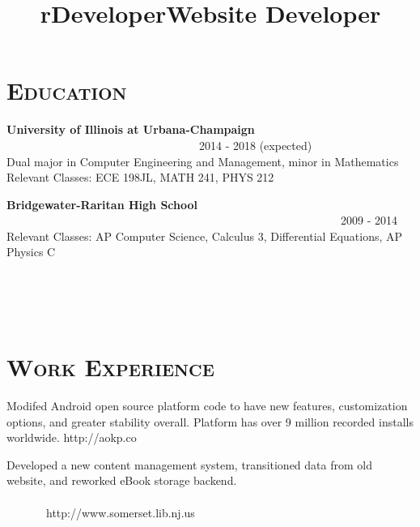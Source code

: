\begin{resume}
\section{\textsc{Education}}
\textbf{University of Illinois at Urbana-Champaign} \ \ \ \ \ \ \ \ \ \ \ \ \ \ \ \ \ \ \ \ \ \ \ \ \ \ \ \ \ \ \ \ \ \ 2014 - 2018 (expected) \\
Dual major in Computer Engineering and Management, minor in Mathematics \\
Relevant Classes: ECE 198JL, MATH 241, PHYS 212

\textbf{Bridgewater-Raritan High School} \ \ \ \ \ \ \ \ \ \ \ \ \ \ \ \ \ \ \ \ \ \ \ \ \ \ \ \ \ \ \ \ \ \ \ \ \ \ \ \ \ \ \ \ \ \ \ \ \ \ \ \ \ \ \ \ \ \ \ 2009 - 2014 \\
Relevant Classes: AP Computer Science, Calculus 3, Differential Equations, AP Physics C

\begin{formatb}
  \title{r}\\
  \\
  \body\\
\end{formatb}

\section{\textsc{Work Experience}}

\title{Developer}
\begin{position}
Modifed Android open source platform code to have new features, customization options, and greater stability overall. Platform has over 9 million recorded installs worldwide. http://aokp.co
\end{position}

\title{Website Developer}
\begin{position}
Developed a new content management system, transitioned data from old website, and reworked eBook storage backend. \ \ \ \ \ \ \ \ \ \ \ \ \ \ \ \ \ \ \ \ \ \ \ \ \ \ \ \ \ \ \ \ \ \ \ \ \ \ \ \ \ \ \ \ \ \ \ \ \ \ \ \ \ \ \ \ \ \ \ \ \ \ \ \ \ \ \ \ \ \ \ \ \ \ \ \ \ \ \ http://www.somerset.lib.nj.us
\end{position}


\end{resume}
